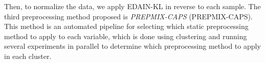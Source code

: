 \documentclass{statsmsc}
\begin{document}
{%
Then, to normalize the data, we apply \ac{EDAIN-KL} in reverse to each sample.
The third preprocessing method proposed is \textit{\acl{PREPMIX-CAPS}} (\acs{PREPMIX-CAPS}).
This method is an automated pipeline for selecting which static preprocessing method to apply
to each variable, which is done using clustering and running several experiments in parallel to
determine which preprocessing method to apply in each cluster.

}
\end{document}
